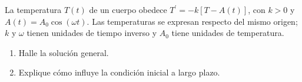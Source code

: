 La temperatura $T(t)$ de un cuerpo obedece $T^{\prime}=-k[T-A(t)]$, con $k>0$ y $A(t)=A_0\cos(\omega t)$. Las temperaturas se expresan respecto del mismo origen; $k$ y $\omega$ tienen unidades de tiempo inverso y $A_0$ tiene unidades de temperatura.

\begin{enumerate}[label=(\alph*),ref=\alph*,leftmargin=*]
\item Halle la solución general.
\item Explique cómo influye la condición inicial a largo plazo.
\end{enumerate}
